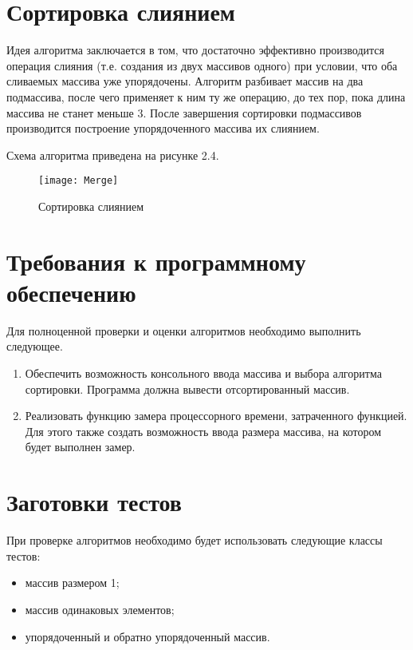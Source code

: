\section{Сортировка слиянием}
Идея алгоритма заключается в том, что достаточно эффективно производится операция слияния (т.е. создания из двух массивов одного) при условии, что оба сливаемых массива уже упорядочены. Алгоритм разбивает массив на два подмассива, после чего применяет к ним ту же операцию, до тех пор, пока длина массива не станет меньше 3. После завершения сортировки подмассивов производится построение упорядоченного массива их слиянием.

Схема алгоритма приведена на рисунке 2.4.
\begin{figure}[h]
	\begin{center}
		{\texttt{[image: Merge]}}
		\caption{Сортировка слиянием}
	\end{center}
\end{figure}


\section{Требования к программному обеспечению}
Для полноценной проверки и оценки алгоритмов необходимо выполнить следующее.
\begin{enumerate}
	\item Обеспечить возможность консольного ввода массива и выбора алгоритма сортировки. Программа должна вывести отсортированный массив.
	\item Реализовать функцию замера процессорного времени, затраченного функцией. Для этого также создать возможность ввода размера массива, на котором будет выполнен замер.
\end{enumerate}


\section{Заготовки тестов}
При проверке алгоритмов необходимо будет использовать следующие классы тестов:
\begin{itemize}
	\item массив размером 1;
	\item массив одинаковых элементов;
	\item упорядоченный и обратно упорядоченный массив.
\end{itemize}



